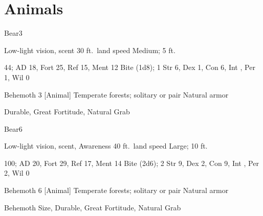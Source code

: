 \section{Animals}

    \begin{monsection}[Black]{Bear}{3}
        \begin{spellcontent}
            \begin{spelltargetinginfo}
                \pari {} Low-light vision, scent
                \pari {} 30 ft.\ land speed
                \pari {} Medium;  5 ft.
            \end{spelltargetinginfo}
            \begin{spelleffects}
                \pari {} 44;  AD 18, Fort 25, Ref 15, Ment 12
                \pari {} Bite  (1d8);  1
                \pari {} Str 6, Dex 1, Con 6, Int , Per 1, Wil 0
            \end{spelleffects}
        \end{spellcontent}
        \begin{spellfooter}
            \pari {} Behemoth 3 [Animal]
            \pari {} Temperate forests; solitary or pair
            \pari {} Natural armor 
        \end{spellfooter}
    \end{monsection}
     Durable, Great Fortitude, Natural Grab

    \begin{monsection}[Brown]{Bear}{6}
        \begin{spellcontent}
            \begin{spelltargetinginfo}
                \pari {} Low-light vision, scent, Awareness 
                \pari {} 40 ft.\ land speed
                \pari {} Large;  10 ft.
            \end{spelltargetinginfo}
            \begin{spelleffects}
                \pari {} 100;  AD 20, Fort 29, Ref 17, Ment 14
                \pari {} Bite  (2d6);  2
                \pari {} Str 9, Dex 2, Con 9, Int , Per 2, Wil 0
            \end{spelleffects}
        \end{spellcontent}
        \begin{spellfooter}
            \pari {} Behemoth 6 [Animal]
            \pari {} Temperate forests; solitary or pair
            \pari {} Natural armor 
        \end{spellfooter}
    \end{monsection}
     Behemoth Size, Durable, Great Fortitude, Natural Grab
